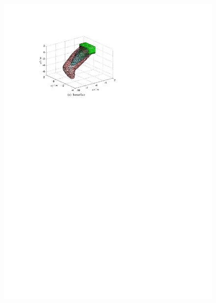 \begin{figure}[h]
	\centering
	\begin{minipage}{0.45\linewidth}
		\centering
		\includegraphics[width=1\linewidth]{Figures/Figs_Ch13/Fig8_1}
	\end{minipage}	\qquad
	\begin{minipage}{0.45\linewidth}
		\centering

\end{minipage}
\end{figure}
